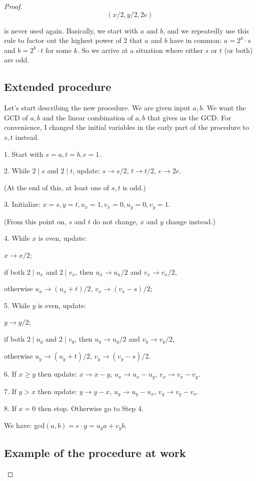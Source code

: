 \documentclass[14pt]{extarticle}
\begin{document}
\begin{proof}
$$
(x/2, y/2, 2e)
$$ 

is never used again. Basically, we start with $a$ and $b$, and we repeatedly use this rule to factor out the highest power of $2$ that $a$ and $b$ have in common: $a = 2^k \cdot s$ and $b = 2^k \cdot t$ for some $k$. So we arrive at a situation where either $s$ or $t$ (or both) are odd.

\subsection{Extended procedure}

Let's start describing the new procedure. We are given input $a, b$. We want the GCD of $a,b$ and the linear combination of $a,b$ that gives us the GCD. For convenience, I changed the initial variables in the early part of the procedure to $s,t$ instead.

1. Start with $s = a, t = b, e = 1$.

2. While $2 \mid s$ and $2 \mid t$, update: $s \to s/2$, $t \to t/2$, $e \to 2e$. 

(At the end of this, at least one of $s,t$ is odd.)

3. Initialize: $x = s, y = t, u_x = 1, v_x = 0, u_y = 0, v_y = 1$. 

(From this point on, $s$ and $t$ do not change, $x$ and $y$ change instead.)

4. While $x$ is even, update: 

$x \to x/2$;

if both $2 \mid u_x$ and $2 \mid v_x$, then $u_x \to u_x/2$ and $v_x \to v_x / 2$,

otherwise $u_x \to (u_x + t)/2$, $v_x \to (v_x - s)/2$;

5. While $y$ is even, update: 

$y \to y/2$;

if both $2 \mid u_y$ and $2 \mid v_y$, then $u_y \to u_y/2$ and $v_y \to v_y / 2$,

otherwise $u_y \to (u_y + t)/2$, $v_y \to (v_y - s)/2$.

6. If $x \geq y$ then update: $x \to x - y$, $u_x \to u_x - u_y$, $v_x \to v_x - v_y$.

7. If $y > x$ then update: $y \to y - x$, $u_y \to u_y - u_x$, $v_y \to v_y - v_x$.

8. If $x = 0$ then stop. Otherwise go to Step 4.

We have: gcd$(a,b) = e \cdot y = u_y a + v_y b $.

\subsection{Example of the procedure at work} 


\end{proof}
\end{document}
